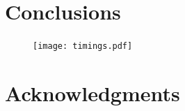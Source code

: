 \documentclass{mc2015}
\begin{document}
\section{Conclusions}

\begin{figure}[h]
	\texttt{[image: timings.pdf]}
\end{figure}

\section{Acknowledgments}



\setlength{\baselineskip}{12pt}




\appendix
\section{}
\end{document}
